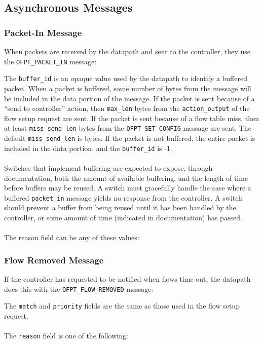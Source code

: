\subsection{Asynchronous Messages}
\subsubsection{Packet-In Message}
When packets are received by the datapath and sent to the controller, they use the \verb|OFPT_PACKET_IN| message:


The \verb|buffer_id| is an opaque value used by the datapath to identify a buffered packet.  When a packet is buffered, some number of bytes from the message will be included in the data portion of the message.  If the packet is sent because of a ``send to controller'' action, then \verb|max_len| bytes from the \verb|action_output| of the flow setup request are sent.  If the packet is sent because of a flow table miss, then at least \verb|miss_send_len| bytes from the \verb|OFPT_SET_CONFIG| message are sent.  The default \verb|miss_send_len| is bytes.  If the packet is not buffered, the entire packet is included in the data portion, and the \verb|buffer_id| is -1.  
\\\\
Switches that implement buffering are expected to expose, through documentation, both the amount of available buffering, and the length of time before buffers may be reused.  A switch must gracefully handle the case where a buffered \verb|packet_in| message yields no response from the controller.  A switch should prevent a buffer from being reused until it has been handled by the controller, or some amount of time (indicated in documentation) has passed.
\\\\
The reason field can be any of these values:


 
\subsubsection{Flow Removed Message}
If the controller has requested to be notified when flows time out, the datapath does this with the \verb|OFPT_FLOW_REMOVED| message:


The \verb|match| and \verb|priority| fields are the same as those used in the flow setup request.  
\\\\
The \verb|reason| field is one of the following:

